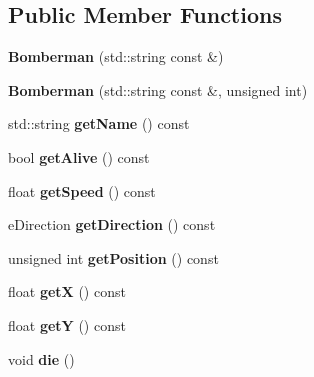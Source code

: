 \subsection*{Public Member Functions}
\begin{DoxyCompactItemize}
\item 
\hypertarget{class_bomberman_a1adc7332b2a434363ae5154cd7eeeb05}{}{\bfseries Bomberman} (std\+::string const \&)\label{class_bomberman_a1adc7332b2a434363ae5154cd7eeeb05}

\item 
\hypertarget{class_bomberman_ac454da9cadc77b2447b9b5bf31bfd91e}{}{\bfseries Bomberman} (std\+::string const \&, unsigned int)\label{class_bomberman_ac454da9cadc77b2447b9b5bf31bfd91e}

\item 
\hypertarget{class_bomberman_a0763e69f82fbb6f547ba8b65e022dba6}{}std\+::string {\bfseries get\+Name} () const \label{class_bomberman_a0763e69f82fbb6f547ba8b65e022dba6}

\item 
\hypertarget{class_bomberman_a02eb750c906bbddb385d016d93b2f5ca}{}bool {\bfseries get\+Alive} () const \label{class_bomberman_a02eb750c906bbddb385d016d93b2f5ca}

\item 
\hypertarget{class_bomberman_ad7c40e7d40493d880c9ebab1d602aa74}{}float {\bfseries get\+Speed} () const \label{class_bomberman_ad7c40e7d40493d880c9ebab1d602aa74}

\item 
\hypertarget{class_bomberman_afee2a0367b88c9c12ca4348c05086000}{}e\+Direction {\bfseries get\+Direction} () const \label{class_bomberman_afee2a0367b88c9c12ca4348c05086000}

\item 
\hypertarget{class_bomberman_ac3aa9cf0bb7004437ca661ebaa44c342}{}unsigned int {\bfseries get\+Position} () const \label{class_bomberman_ac3aa9cf0bb7004437ca661ebaa44c342}

\item 
\hypertarget{class_bomberman_ae2fe0a372ba0cef1949ae98648ebe016}{}float {\bfseries get\+X} () const \label{class_bomberman_ae2fe0a372ba0cef1949ae98648ebe016}

\item 
\hypertarget{class_bomberman_a29e3b35b2c0a27f5b8f5b075a8fc41ba}{}float {\bfseries get\+Y} () const \label{class_bomberman_a29e3b35b2c0a27f5b8f5b075a8fc41ba}

\item 
\hypertarget{class_bomberman_a38910509b407e4bcab8ca034dd29ab92}{}void {\bfseries die} ()\label{class_bomberman_a38910509b407e4bcab8ca034dd29ab92}


\end{DoxyCompactItemize}
